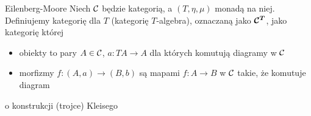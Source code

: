 \begin{definition}{Eilenberg-Moore}{}
  Niech $\mathcal{C}$ będzie kategorią, a $(T,\eta,\mu)$ monadą na niej. Definiujemy kategorię  dla $T$ (kategorię $T$-algebra), oznaczaną jako $\boldsymbol{\mathcal{C}^T}$, jako kategorię której
  \begin{itemize}
    \item obiekty to pary $A\in\mathcal{C}$, $a:TA\to A$ dla których komutują diagramy w $\mathcal{C}$
      \begin{center}
      \end{center}
    \item {\color{red} morfizmy $f:(A, a)\to (B, b)$ są mapami $f:A\to B$ w $\mathcal{C}$ takie, że komutuje diagram }
      \begin{center}
      \end{center}
  \end{itemize}
\end{definition}



o konstrukcji (trojce) Kleisego





